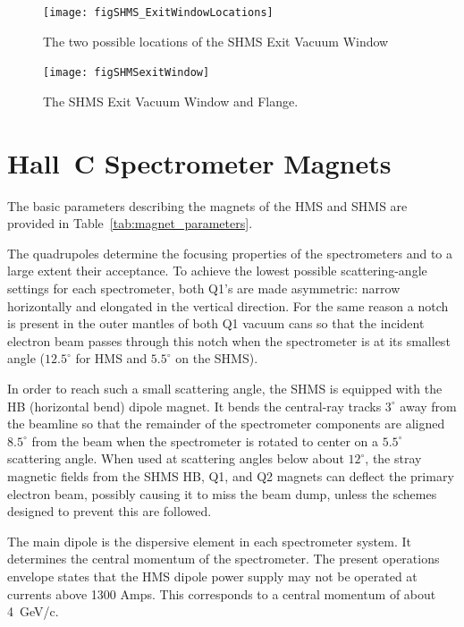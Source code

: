 {\begin{figure}
\begin{center}
\texttt{[image: figSHMS\_ExitWindowLocations]}
\caption{The two possible locations of the SHMS Exit Vacuum Window \label{fig:shms_exit_window_locations}}
\end{center}
\end{figure}

\begin{figure}
\begin{center}
\texttt{[image: figSHMSexitWindow]}
\caption{The SHMS Exit Vacuum Window and Flange. \label{fig:shms_exit_window}}
\end{center}
\end{figure}

\section{Hall~C Spectrometer Magnets}

The basic parameters describing the magnets of the HMS and SHMS are provided in
Table~\ref{tab:magnet_parameters}. 

The quadrupoles determine the focusing properties of the spectrometers
and to a large extent their acceptance.
To achieve the lowest possible scattering-angle
settings for each spectrometer, both Q1's are
made asymmetric: narrow horizontally and elongated in the vertical direction. For the same
reason a notch is present in the outer mantles of both Q1 vacuum cans so
that the incident electron beam passes through this notch when the
spectrometer is at its smallest angle ($12.5^{\circ}$ for HMS and $5.5^{\circ}$ on the SHMS).

In order to reach such a small scattering angle, the SHMS is equipped with the HB
(horizontal bend) dipole magnet. It bends the central-ray tracks $3^{\circ}$ away from the
beamline so that the remainder of the spectrometer components are aligned $8.5^{\circ}$
from the beam when the spectrometer is rotated to center on a $5.5^{\circ}$ scattering angle.
When used at scattering angles below about $12^{\circ}$, the stray magnetic fields from 
the SHMS HB, Q1, and Q2 magnets can deflect the primary electron beam, possibly 
causing it to miss the beam dump, unless the schemes designed to prevent this are followed. 

The main dipole is the dispersive element in each spectrometer system. It 
determines the central momentum of the spectrometer.
The present operations envelope states that the HMS dipole power supply may not be
operated at currents above 1300 Amps. This corresponds to a central
momentum of about 4~GeV/c. 



}
